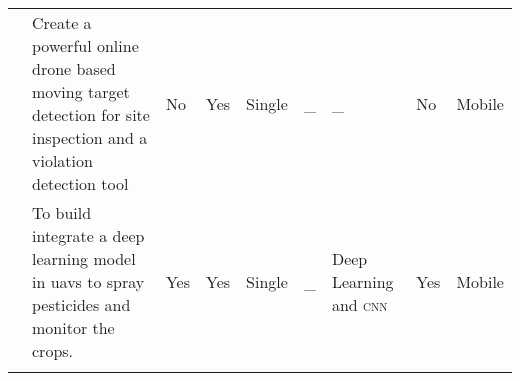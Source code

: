 {\begin{center}
\begin{small}
\begin{longtable}{ p{0.6cm} p{4cm} p{1.6cm} p{1.3cm} p{1.4cm} p{1.4cm} p{1.4cm} p{1.4cm} p{1.4cm} }
            \cite{Wang18} 
                & Create a powerful online drone 
                based moving target detection 
                for site inspection and 
                a violation detection tool 
                    & No 
                        & Yes 
            & Single 
                & \_
                    & \_
                    	& No
                        	& Mobile  \\

            \cite{Khan21}
                & To build integrate a deep 
                learning model in \glspl{uav} to spray 
                pesticides and monitor the crops.
                    & Yes 
                        & Yes 
            & Single 
                & \_
                	& Deep Learning and \textsc{cnn}     
                    	& Yes 
                        	& Mobile \\ \addlinespace

            \bottomrule
        \end{longtable}
    \end{small}
\end{center}
}

